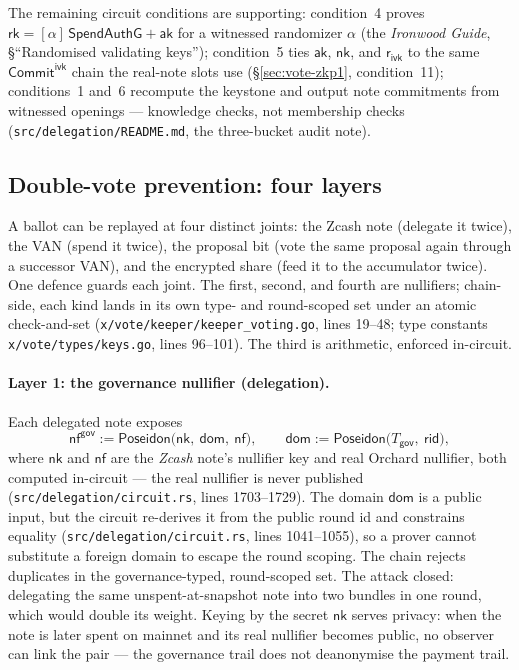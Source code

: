 \documentclass[11pt,a4paper]{article}
\theoremstyle{definition}
\newcommand{\nfsym}{\mathsf{nf}}
\newcommand{\rk}{\mathsf{rk}}
\newcommand{\CommitIvk}{\ensuremath{\mathsf{Commit}^{\mathsf{ivk}}}}
\newcommand{\aksym}{\ensuremath{\mathsf{ak}}}
\newcommand{\nksym}{\ensuremath{\mathsf{nk}}}
\newcommand{\rivk}{\ensuremath{\mathsf{r_{ivk}}}}
\begin{document}
The remaining circuit conditions are supporting:
condition~4 proves $\rk = [\alpha]\,\mathsf{SpendAuthG} + \aksym$ for a
witnessed randomizer $\alpha$ (the \emph{Ironwood Guide},
\S``Randomised validating keys''); condition~5 ties $\aksym$,
$\nksym$, and $\rivk$ to the same \CommitIvk{} chain the real-note slots
use (\S\ref{sec:vote-zkp1}, condition~11); conditions~1 and~6 recompute
the keystone and output note commitments from witnessed openings ---
knowledge checks, not membership checks
(\texttt{src/delegation/README.md}, the three-bucket audit note).

\subsection{Double-vote prevention: four layers}\label{sec:vote-layers}

A ballot can be replayed at four distinct joints: the Zcash note (delegate it
twice), the VAN (spend it twice), the proposal bit (vote the same proposal
again through a successor VAN), and the encrypted share (feed it to the
accumulator twice). One defence guards each joint. The first, second, and
fourth are nullifiers; chain-side, each kind lands in its own type- and
round-scoped set under an atomic check-and-set
(\texttt{x/vote/keeper/keeper\_voting.go}, lines 19--48; type constants
\texttt{x/vote/types/keys.go}, lines 96--101). The third is arithmetic,
enforced in-circuit.

\paragraph{Layer 1: the governance nullifier (delegation).} Each delegated
note exposes
\[
\nfsym^{\mathsf{gov}} := \mathsf{Poseidon}\bigl(\nksym,\ \mathsf{dom},\
\nfsym\bigr), \qquad
\mathsf{dom} := \mathsf{Poseidon}\bigl(T_{\mathsf{gov}},\ \mathsf{rid}\bigr),
\]
where $\nksym$ and $\nfsym$ are the \emph{Zcash} note's nullifier key and
real Orchard nullifier, both computed in-circuit --- the real nullifier is
never published (\texttt{src/delegation/circuit.rs}, lines 1703--1729). The
domain $\mathsf{dom}$ is a public input, but the circuit re-derives it from
the public round id and constrains equality
(\texttt{src/delegation/circuit.rs}, lines 1041--1055), so a prover cannot
substitute a foreign domain to escape the round scoping. The chain rejects
duplicates in the governance-typed, round-scoped set. The attack closed:
delegating the same unspent-at-snapshot note into two bundles in one round,
which would double its weight. Keying by the secret $\nksym$ serves privacy:
when the note is later spent on mainnet and its real nullifier becomes
public, no observer can link the pair --- the governance trail does not
deanonymise the payment trail.
\end{document}
